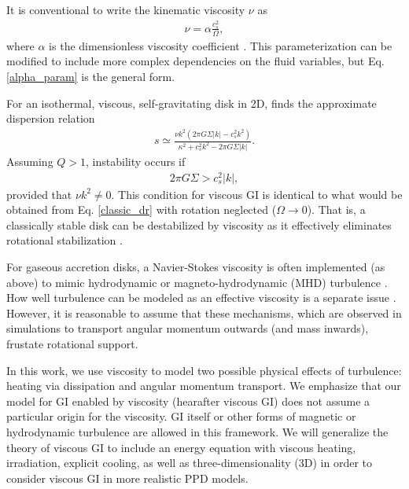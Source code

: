 \documentclass[iop, numberedappendix]{emulateapj}
\begin{document}
It is conventional to write the kinematic viscosity $\nu$ as   
\begin{align}\label{alpha_param}
  \nu  = \alpha \frac{c_s^2}{\Omega}, %
\end{align}
where $\alpha$ is the dimensionless viscosity
coefficient \cite{shakura73}. This
parameterization can be modified to include more complex dependencies on the
fluid variables, but Eq. \ref{alpha_param} is the general form. 

For an isothermal, viscous, self-gravitating disk in 2D,
\cite{gammie96} finds the approximate dispersion relation   
\begin{align}
s \simeq \frac{\nu k^2\left(2\pi G\Sigma |k| -
  c_s^2k^2\right)}{\kappa^2 + c_s^2k^2 - 2\pi G\Sigma|k|}. 
\end{align}
Assuming $Q>1$, instability occurs if 
\begin{align*}
  2\pi G \Sigma > c_s^2|k|,
\end{align*}
provided that $\nu k^2\neq0$. This condition for viscous GI is 
identical to what would be obtained from Eq. \ref{classic_dr} with
rotation neglected ($\Omega\to 0$). That is, a classically stable
disk can be destabilized by viscosity as it effectively eliminates
rotational stabilization \citep{lynden-bell74}.  

For gaseous accretion disks, a Navier-Stokes viscosity is often
implemented (as above) to mimic hydrodynamic or magneto-hydrodynamic
(MHD) turbulence \citep{shakura73}. How well turbulence can be modeled
as an effective viscosity is a separate issue 
\citep{balbus99}. However, it is reasonable to assume that these
mechanisms, which are observed in simulations  
to transport angular momentum outwards (and mass inwards),
frustate rotational support. 

In this work, we use viscosity to model two possible
physical effects of turbulence: heating via dissipation and angular momentum transport. 
We emphasize that our model for GI enabled by viscosity (hearafter
viscous GI) does not assume a particular origin for the viscosity. GI
itself or other forms of magnetic or hydrodynamic turbulence are 
allowed in this framework. We will generalize the theory of viscous GI
to include an energy equation  with viscous heating, irradiation,
explicit cooling, as well as three-dimensionality (3D) in order to
consider viscous GI in more realistic PPD models.   
\end{document}
